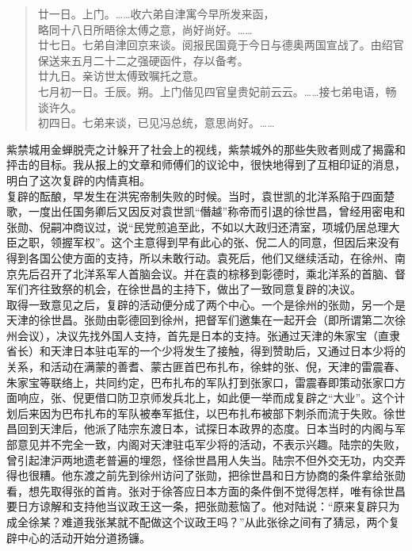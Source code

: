 \begin{quote}
廿一日。上门。……收六弟自津寓今早所发来函，\\

略同十八日所晤徐太傅之意，尚好尚好。……\\

廿七日。七弟自津回京来谈。阅报民国竟于今日与德奥两国宣战了。由绍官保送来五月二十二之强硬函件，存以备考。\\

廿九日。亲访世太傅致嘱托之意。\\

七月初一日。壬辰。朔。上门偕见四官皇贵妃前云云。……接七弟电语，畅谈许久。\\

初四日。七弟来谈，已见冯总统，意思尚好。……\\
\end{quote}

紫禁城用金蝉脱壳之计躲开了社会上的视线，紫禁城外的那些失败者则成了揭露和抨击的目标。我从报上的文章和师傅们的议论中，很快地得到了互相印证的消息，明白了这次复辟的内情真相。\\

复辟的酝酿，早发生在洪宪帝制失败的时候。当时，袁世凯的北洋系陷于四面楚歌，一度出任国务卿后又因反对袁世凯“僭越”称帝而引退的徐世昌，曾经用密电和张勋、倪嗣冲商议过，说“民党煎追至此，不如以大政归还清室，项城仍居总理大臣之职，领握军权”。这个主意得到早有此心的张、倪二人的同意，但因后来没有得到各国公使方面的支持，所以未敢行动。袁死后，他们又继续活动，在徐州、南京先后召开了北洋系军人首脑会议。并在袁的棕移到彰德时，乘北洋系的首脑、督军们齐往致祭的机会，在徐世昌的主持下，做出了一致同意复辟的决议。\\

取得一致意见之后，复辟的活动便分成了两个中心。一个是徐州的张勋，另一个是天津的徐世昌。张勋由彰德回到徐州，把督军们邀集在一起开会（即所谓第二次徐州会议），决议先找外国人支持，首先是日本的支持。张通过天津的朱家宝（直隶省长）和天津日本驻屯军的一个少将发生了接触，得到赞助后，又通过日本少将的关系，和活动在满蒙的善耆、蒙古匪首巴布扎布，徐蚌的张、倪，天津的雷震春、朱家宝等联络上，共同约定，巴布扎布的军队打到张家口，雷震春即策动张家口方面响应，张、倪更借口防卫京师发兵北上，如此便一举而成复辟之“大业”。这个计划后来因为巴布扎布的军队被奉军抵住，以巴布扎布被部下刺杀而流于失败。徐世昌回到天津后，他派了陆宗东渡日本，试探日本政界的态度。日本当时的内阁与军部意见并不完全一致，内阁对天津驻屯军少将的活动，不表示兴趣。陆宗的失败，曾引起津沪两地遗老普遍的埋怨，怪徐世昌用人失当。陆宗不但外交无功，内交弄得也很糟。他东渡之前先到徐州访问了张勋，把徐世昌和日方协商的条件拿给张勋看，想先取得张的首肯。张对于徐答应日本方面的条件倒不觉得怎样，唯有徐世昌要日方谅解和支持他当议政王这一条，把张勋惹恼了。他对陆说：“原来复辟只为成全徐某？难道我张某就不配做这个议政王吗？”从此张徐之间有了猜忌，两个复辟中心的活动开始分道扬镰。\\

